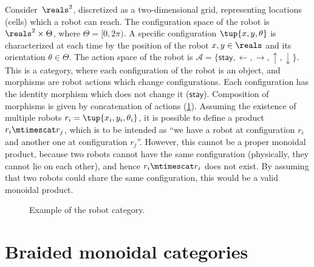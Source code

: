 \begin{example}
    \label{ex:robot}
    Consider~$\reals^2$, discretized as a two-dimensional grid, representing locations (cells) which a robot can reach.
    The configuration space of the robot is $\reals^2\times \Theta$, where $\Theta=[0,2\pi)$.
    A specific configuration $\tup{x,y,\theta}$ is characterized at each time by the position of the robot $x,y\in \reals$ and its orientation $\theta \in \Theta$.
    The action space of the robot is $\mathcal{A}=\{\mathsf{stay},\leftarrow, \rightarrow, \uparrow, \downarrow\}$.
    This is a category, where each configuration of the robot is an object, and morphisms are robot actions which change configurations.
    Each configuration has the identity morphism which does not change it ($\mathsf{stay}$).
    Composition of morphisms is given by concatenation of actions (\cref{fig:robotcategory}).
    Assuming the existence of multiple robots $r_i=\tup{x_i,y_i,\theta_i}$, it is possible to define a product $r_i\mtimescat r_j$, which is to be intended as ``we have a robot at configuration $r_i$ and another one at configuration $r_j$''.
    However, this cannot be a proper monoidal product, because two robots cannot have the same configuration (physically, they cannot lie on each other), and hence $r_i\mtimescat r_i$ does not exist.
    By assuming that two robots could share the same configuration, this would be a valid monoidal product.
    \begin{figure}[tbh]
        \centering
        \caption{Example of the robot category. }
        \label{fig:robotcategory}
    \end{figure}
\end{example}


\section{Braided monoidal categories}


